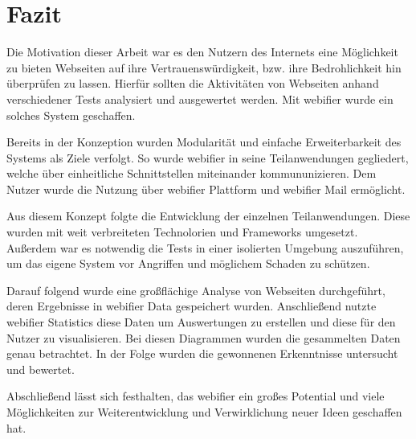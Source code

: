 \chapter{Fazit}

Die Motivation dieser Arbeit war es den Nutzern des Internets eine Möglichkeit zu bieten Webseiten
auf ihre Vertrauenswürdigkeit, bzw. ihre Bedrohlichkeit hin überprüfen zu lassen. Hierfür sollten
die Aktivitäten von Webseiten anhand verschiedener Tests analysiert und ausgewertet werden. Mit
webifier wurde ein solches System geschaffen.

Bereits in der Konzeption wurden Modularität und einfache Erweiterbarkeit des Systems als Ziele
verfolgt. So wurde webifier in seine Teilanwendungen gegliedert, welche über einheitliche
Schnittstellen miteinander kommununizieren. Dem Nutzer wurde die Nutzung über webifier Plattform und
webifier Mail ermöglicht. 

Aus diesem Konzept folgte die Entwicklung der einzelnen Teilanwendungen. Diese wurden mit weit
verbreiteten Technolorien und Frameworks umgesetzt. Außerdem war es notwendig die Tests in einer
isolierten Umgebung auszuführen, um das eigene System vor Angriffen und möglichem Schaden zu
schützen.

Darauf folgend wurde eine großflächige Analyse von Webseiten durchgeführt, deren Ergebnisse in
webifier Data gespeichert wurden. Anschließend nutzte webifier Statistics diese Daten um
Auswertungen zu erstellen und diese für den Nutzer zu visualisieren. Bei diesen Diagrammen wurden
die gesammelten Daten genau betrachtet. In der Folge wurden die gewonnenen Erkenntnisse
untersucht und bewertet.

Abschließend lässt sich festhalten, das webifier ein großes Potential und viele Möglichkeiten zur
Weiterentwicklung und Verwirklichung neuer Ideen geschaffen hat.